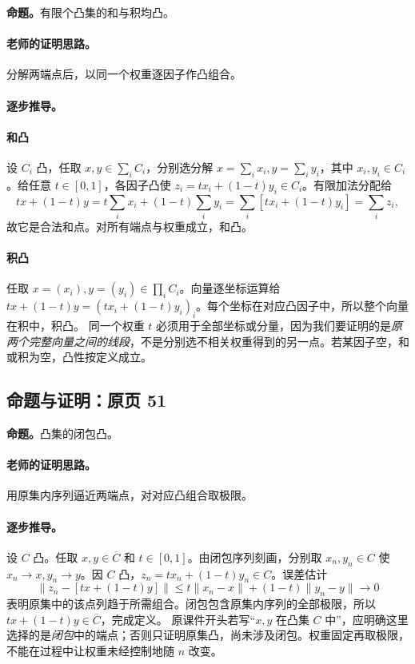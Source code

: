\textbf{命题。}有限个凸集的和与积均凸。

\paragraph{老师的证明思路。}分解两端点后，以同一个权重逐因子作凸组合。

\paragraph{逐步推导。}
\paragraph{和凸}设 $C_i$ 凸，任取 $x,y\in\sum_iC_i$，分别选分解 $x=\sum_ix_i,y=\sum_iy_i$，其中 $x_i,y_i\in C_i$。给任意 $t\in[0,1]$，各因子凸使 $z_i=tx_i+(1-t)y_i\in C_i$。有限加法分配给
\[tx+(1-t)y=t\sum_ix_i+(1-t)\sum_iy_i=\sum_i[tx_i+(1-t)y_i]=\sum_iz_i,\]
故它是合法和点。对所有端点与权重成立，和凸。
\paragraph{积凸}任取 $x=(x_i),y=(y_i)\in\prod_iC_i$。向量逐坐标运算给 $tx+(1-t)y=(tx_i+(1-t)y_i)_i$。每个坐标在对应凸因子中，所以整个向量在积中，积凸。
同一个权重 $t$ 必须用于全部坐标或分量，因为我们要证明的是\emph{原两个完整向量之间的线段}，不是分别选不相关权重得到的另一点。若某因子空，和或积为空，凸性按定义成立。


\subsection{命题与证明：原页 51}

\textbf{命题。}凸集的闭包凸。

\paragraph{老师的证明思路。}用原集内序列逼近两端点，对对应凸组合取极限。

\paragraph{逐步推导。}
设 $C$ 凸。任取 $x,y\in\overline C$ 和 $t\in[0,1]$。由闭包序列刻画，分别取 $x_n,y_n\in C$ 使 $x_n\to x,y_n\to y$。因 $C$ 凸，$z_n=tx_n+(1-t)y_n\in C$。误差估计
\[\|z_n-[tx+(1-t)y]\|\le t\|x_n-x\|+(1-t)\|y_n-y\|\to0\]
表明原集中的该点列趋于所需组合。闭包包含原集内序列的全部极限，所以 $tx+(1-t)y\in\overline C$，完成定义。
原课件开头若写“$x,y$ 在凸集 $C$ 中”，应明确这里选择的是\emph{闭包}中的端点；否则只证明原集凸，尚未涉及闭包。权重固定再取极限，不能在过程中让权重未经控制地随 $n$ 改变。


